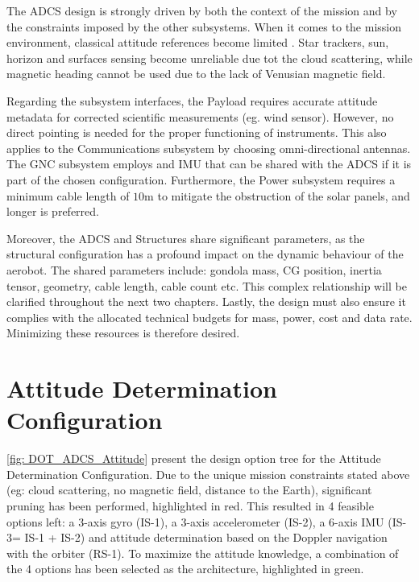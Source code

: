 The ADCS design is strongly driven by both the context of the mission and by the constraints imposed by the other subsystems. When it comes to the mission environment, classical attitude references become limited \cite{Cutts2022VenusAerobot}. Star trackers, sun, horizon and surfaces sensing become unreliable due tot the cloud scattering, while magnetic heading cannot be used due to the lack of Venusian magnetic field.

Regarding the subsystem interfaces, the Payload requires accurate attitude metadata for corrected scientific measurements (eg. wind sensor). However, no direct pointing is needed for the proper functioning of instruments. This also applies to the Communications subsystem by choosing omni-directional antennas. The GNC subsystem employs and IMU that can be shared with the ADCS if it is part of the chosen configuration. Furthermore, the Power subsystem requires a minimum cable length of $10$m to mitigate the obstruction of the solar panels, and longer is preferred. 

Moreover, the ADCS and Structures share significant parameters, as the structural configuration has a profound impact on the dynamic behaviour of the aerobot. The shared parameters include: gondola mass, CG position, inertia tensor, geometry, cable length, cable count etc. This complex relationship will be clarified throughout the next two chapters. Lastly, the design must also ensure it complies with the allocated technical budgets for mass, power, cost and data rate. Minimizing these resources is therefore desired. 

\section{Attitude Determination Configuration}
\label{sec: Attitude determination configuration}
\autoref{fig: DOT_ADCS_Attitude} present the design option tree for the Attitude Determination Configuration. Due to the unique mission constraints stated above (eg: cloud scattering, no magnetic field, distance to the Earth), significant pruning has been performed, highlighted in red. This resulted in 4 feasible options left: a 3-axis gyro (IS-1), a 3-axis accelerometer (IS-2), a 6-axis IMU (IS-3= IS-1 + IS-2) and attitude determination based on the Doppler navigation with the orbiter (RS-1). To maximize the attitude knowledge, a combination of the 4 options has been selected as the architecture, highlighted in green. 

